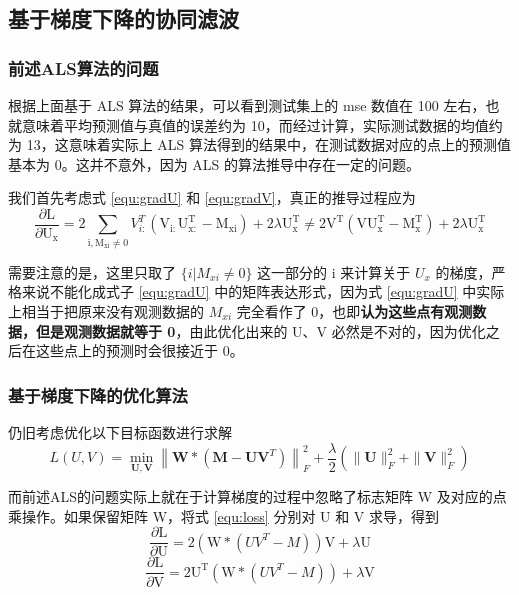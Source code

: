 \documentclass[UTF8,12pt]{ctexart}
\begin{document}
\subsection{基于梯度下降的协同滤波}

\subsubsection{前述ALS算法的问题}
根据上面基于 ALS 算法的结果，可以看到测试集上的 mse 数值在 100 左右，也就意味着平均预测值与真值的误差约为 10，而经过计算，实际测试数据的均值约为 13，这意味着实际上 ALS 算法得到的结果中，在测试数据对应的点上的预测值基本为 0。这并不意外，因为 ALS 的算法推导中存在一定的问题。

我们首先考虑式 \ref{equ:gradU} 和 \ref{equ:gradV}，真正的推导过程应为
\begin{equation}
\label{equ:truegradU}
\frac{\partial \mathrm{L}}{\partial \mathrm{U}_{\mathrm{x}}}=2 \sum_{\mathrm{i}, \mathrm{M}_{\mathrm{xi}} \neq 0} V_{i :}^{T}\left(\mathrm{V}_{\mathrm{i} :} \mathrm{U}_{\mathrm{x} :}^{\mathrm{T}}-\mathrm{M}_{\mathrm{xi}}\right)+2 \lambda \mathrm{U}_{\mathrm{x}}^{\mathrm{T}} \neq 2 \mathrm{V}^{\mathrm{T}}\left(\mathrm{V} \mathrm{U}_{\mathrm{x}}^{\mathrm{T}}-\mathrm{M}_{\mathrm{x}}^{\mathrm{T}}\right)+2 \lambda \mathrm{U}_{\mathrm{x}}^{\mathrm{T}}
\end{equation}

需要注意的是，这里只取了 $\{i |  M_{xi} \ne 0\}$ 这一部分的 i 来计算关于 $U_x$  的梯度，严格来说不能化成式子 \ref{equ:gradU} 中的矩阵表达形式，因为式 \ref{equ:gradU} 中实际上相当于把原来没有观测数据的 $M_{xi}$  完全看作了 0，也即\textbf{认为这些点有观测数据，但是观测数据就等于 0}，由此优化出来的 U、V 必然是不对的，因为优化之后在这些点上的预测时会很接近于 0。

\subsubsection{基于梯度下降的优化算法}
仍旧考虑优化以下目标函数进行求解
\begin{equation}
\label{equ:loss}
L(U,V) = \min _{\mathbf{U}, \mathbf{V}}\left\|\mathbf{W} *\left(\mathbf{M}-\mathbf{U V}^{T}\right)\right\|_{F}^{2}+\frac{\lambda}{2}\left(\|\mathbf{U}\|_{F}^{2}+\|\mathbf{V}\|_{F}^{2}\right)
\end{equation}

而前述ALS的问题实际上就在于计算梯度的过程中忽略了标志矩阵 W 及对应的点乘操作。如果保留矩阵 W，将式 \ref{equ:loss} 分别对 U 和 V 求导，得到
\begin{equation}
\frac{\partial \mathrm{L}}{\partial \mathrm{U}}=2\left(\mathrm{W} *\left(U V^{T}-M\right)\right) \mathrm{V}+\lambda \mathrm{U}
\end{equation}
\begin{equation}
\frac{\partial \mathrm{L}}{\partial \mathrm{V}}=2 \mathrm{U}^{\mathrm{T}}\left(\mathrm{W} *\left(U V^{T}-M\right)\right)+\lambda \mathrm{V}
\end{equation}
\end{document}
